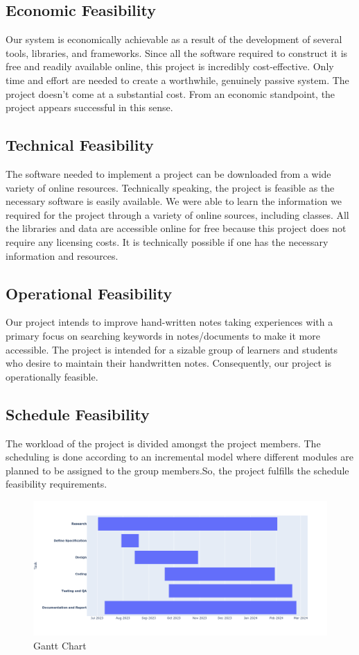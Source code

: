  \subsection{Economic Feasibility}
Our system is economically achievable as a result of the development of several tools,
libraries, and frameworks. Since all the software required to construct it is free and
readily available online, this project is incredibly cost-effective. Only time and effort are
needed to create a worthwhile, genuinely passive system. The project doesn't come at a
substantial cost. From an economic standpoint, the project appears successful in this
sense.

 \subsection{Technical Feasibility}
 The software needed to implement a project can be downloaded from a wide variety of
online resources. Technically speaking, the project is feasible as the necessary software is
easily available. We were able to learn the information we required for the project
through a variety of online sources, including classes. All the libraries and data are
accessible online for free because this project does not require any licensing costs. It is
technically possible if one has the necessary information and resources.

 \subsection{Operational Feasibility}
 Our project intends to improve hand-written notes taking experiences with a primary
focus on searching keywords in notes/documents to make it more accessible. The project
is intended for a sizable group of learners and students who desire to maintain their
handwritten notes. Consequently, our project is operationally feasible.

 \subsection{Schedule Feasibility}
 The workload of the project is divided amongst the project members. The scheduling is
 done according to an incremental model where different modules are planned to be
 assigned to the group members.So, the project fulfills the schedule feasibility
 requirements.
\begin{figure}[h]
    \centering
    \includegraphics[scale=0.35]{images/GanttChart.png}
    \caption{Gantt Chart}\label{fig:my_label}
\end{figure}
